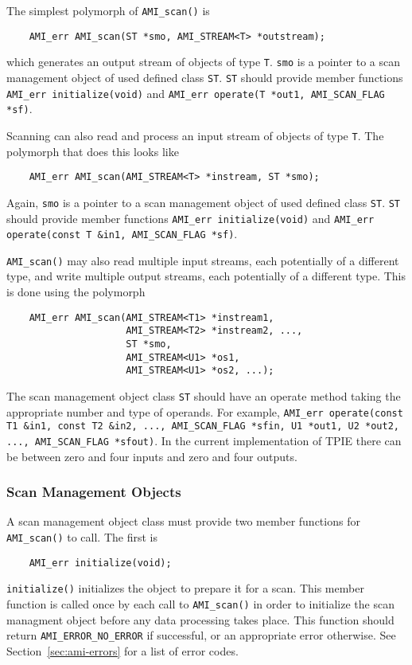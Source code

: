
The simplest polymorph of \verb|AMI_scan()| is
\begin{verbatim}
    AMI_err AMI_scan(ST *smo, AMI_STREAM<T> *outstream);
\end{verbatim}
which generates an output stream of objects of type \verb|T|.
\verb|smo| is a pointer to a scan management object of used defined
class \verb|ST|.  \verb|ST| should provide member functions {\tt
  AMI\_err initialize(void)} and {\tt AMI\_err operate(T *out1,
  AMI\_SCAN\_FLAG *sf)}.

Scanning can also read and process an input stream of objects of type
\verb|T|.  The polymorph that does this looks like
\begin{verbatim}
    AMI_err AMI_scan(AMI_STREAM<T> *instream, ST *smo);
\end{verbatim}
Again, \verb|smo| is a pointer to a scan management object of used
defined class \verb|ST|.  \verb|ST| should provide member functions
{\tt AMI\_err initialize(void)} and {\tt AMI\_err operate(const T
  \&in1, AMI\_SCAN\_FLAG *sf)}.

\verb|AMI_scan()| may also read multiple input streams, each
potentially of a different type, and write multiple output streams,
each potentially of a different type.  This is done using the polymorph
\begin{verbatim}
    AMI_err AMI_scan(AMI_STREAM<T1> *instream1, 
                     AMI_STREAM<T2> *instream2, ..., 
                     ST *smo, 
                     AMI_STREAM<U1> *os1, 
                     AMI_STREAM<U1> *os2, ...);
\end{verbatim}
The scan management object class \verb|ST| should have an operate
method taking the appropriate number and type of operands.  For
example, {\tt AMI\_err operate(const T1 \&in1, const T2 \&in2, ...,
  AMI\_SCAN\_FLAG *sfin, U1 *out1, U2 *out2, ..., AMI\_SCAN\_FLAG
  *sfout)}.  In the current implementation of TPIE there can be
between zero and four inputs and zero and four outputs.


\subsubsection{Scan Management Objects}  

A scan management object class must provide two member functions for
\verb|AMI_scan()| to call.  The first is
\begin{verbatim}
    AMI_err initialize(void);
\end{verbatim}
\verb|initialize()| initializes the object to prepare it for a scan.
This member function is called once by each call to \verb|AMI_scan()|
in order to initialize the scan managment object before any data
processing takes place.  This function should return
\verb|AMI_ERROR_NO_ERROR| if successful, or an appropriate error
otherwise.  See Section~\ref{sec:ami-errors} for a list of error
codes.

